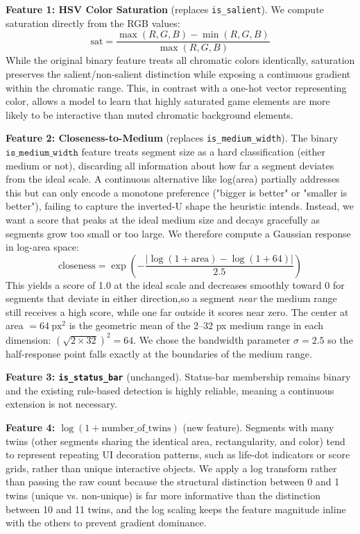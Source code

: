 \documentclass{article}
\begin{document}
\textbf{Feature 1: HSV Color Saturation} (replaces \texttt{is\_salient}). We compute saturation directly from the RGB values:
\begin{equation}
\text{sat} = \frac{\max(R,G,B) - \min(R,G,B)}{\max(R,G,B)}
\end{equation}
While the original binary feature treats all chromatic colors identically, saturation preserves the salient/non-salient distinction while exposing a continuous gradient within the chromatic range. This, in contrast with a one-hot vector representing color, allows a model to learn that highly saturated game elements are more likely to be interactive than muted chromatic background elements.

\textbf{Feature 2: Closeness-to-Medium} (replaces \texttt{is\_medium\_width}). The binary $\texttt{is\_medium\_width}$ feature treats segment size as a hard classification (either medium or not), discarding all information about how far a segment deviates from the ideal scale. A continuous alternative like log(area) partially addresses this but can only encode a monotone preference ("bigger is better" or "smaller is better"), failing to capture the inverted-U shape the heuristic intends. Instead, we want a score that peaks at the ideal medium size and decays gracefully as segments grow too small or too large. We therefore compute a Gaussian response in log-area space:
\begin{equation}
\text{closeness} = \exp\left(-\frac{|\log(1 + \text{area}) - \log(1 + 64)|}{2.5}\right)
\end{equation}
This yields a score of 1.0 at the ideal scale and decreases smoothly toward 0 for segments 
that deviate in either direction,so a segment \textit{near} the medium range still receives 
a high score, while one far outside it scores near zero. The center at area $= 64\ \text{px}^2$ 
is the geometric mean of the 2--32 px medium range in each dimension: 
$(\sqrt{2 \times 32})^2 = 64$. We chose the bandwidth parameter $\sigma = 2.5$ so the half-response point falls exactly at the boundaries of the medium range.

\textbf{Feature 3: \texttt{is\_status\_bar}} (unchanged). Status-bar membership remains binary and the existing rule-based detection is highly reliable, meaning a continuous extension is not necessary.

\textbf{Feature 4: $\log(1 + \text{number\_of\_twins})$} (new feature). Segments with many twins (other segments sharing the identical area, rectangularity, and color) tend to represent repeating UI decoration patterns, such as life-dot indicators or score grids, rather than unique interactive objects. We apply a log transform rather than passing the raw count because the structural distinction between 0 and 1 twins (unique vs. non-unique) is far more informative than the distinction between 10 and 11 twins, and the log scaling keeps the feature magnitude inline with the others to prevent gradient dominance.
\end{document}

